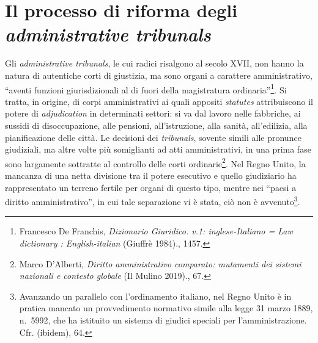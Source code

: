 \documentclass[12pt,it,a4paper,]{report}
\begin{document}
\hypertarget{il-processo-di-riforma-degli-administrative-tribunals}{%
\section{\texorpdfstring{Il processo di riforma degli
\emph{administrative
tribunals}}{Il processo di riforma degli administrative tribunals}}\label{il-processo-di-riforma-degli-administrative-tribunals}}

Gli \emph{administrative tribunals}, le cui radici risalgono al secolo
XVII, non hanno la natura di autentiche corti di giustizia, ma sono
organi a carattere amministrativo, ``aventi funzioni giurisdizionali al
di fuori della magistratura ordinaria''\footnote{{Francesco De Franchis,
  \emph{Dizionario Giuridico. v.1: inglese-Italiano = Law dictionary :
  English-italian} ({Giuffrè} 1984).}, 1457.}. Si tratta, in origine, di
corpi amministrativi ai quali appositi \emph{statutes} attribuiscono il
potere di \emph{adjudication} in determinati settori: si va dal lavoro
nelle fabbriche, ai sussidi di disoccupazione, alle pensioni,
all'istruzione, alla sanità, all'edilizia, alla pianificazione delle
città. Le decisioni dei \emph{tribunals}, sovente simili alle pronunce
giudiziali, ma altre volte più somiglianti ad atti amministrativi, in
una prima fase sono largamente sottratte al controllo delle corti
ordinarie\footnote{{Marco D'Alberti, \emph{Diritto amministrativo
  comparato: mutamenti dei sistemi nazionali e contesto globale} ({Il
  Mulino} 2019).}, 67.}. Nel Regno Unito, la mancanza di una netta
divisione tra il potere esecutivo e quello giudiziario ha rappresentato
un terreno fertile per organi di questo tipo, mentre nei ``paesi a
diritto amministrativo'', in cui tale separazione vi è stata, ciò non è
avvenuto\footnote{Avanzando un parallelo con l'ordinamento italiano, nel
  Regno Unito è in pratica mancato un provvedimento normativo simile
  alla legge 31 marzo 1889, n.~5992, che ha istituito un sistema di
  giudici speciali per l'amministrazione. Cfr. (ibidem), 64.}.
\end{document}
